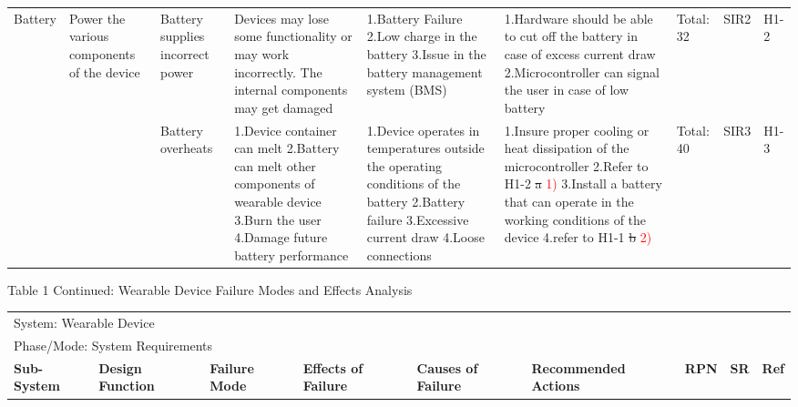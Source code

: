 \documentclass[12pt, titlepage]{article}
\begin{document}
\begin{landscape}
\begin{table}[H]
\begin{tabular}{| p{} | p{}  | p{} | p{} | p{} | p{} | p{} | p{} | p{} |}
        Battery & Power the various components of the device & Battery supplies incorrect power & Devices may lose some functionality or may work incorrectly. The internal components may get damaged & 1.Battery Failure \newline 2.Low charge in the battery \newline 3.Issue in the battery management system (BMS) & 1.Hardware should be able to cut off the battery in case of excess current draw \newline 2.Microcontroller can signal the user in case of low battery & Total: 32 & SIR2 & H1-2 \\ \cline{3-9}

        & &  Battery overheats & 1.Device container can melt \newline 2.Battery can melt other components of wearable device \newline 3.Burn the user \newline 4.Damage future battery performance & 1.Device operates in temperatures outside the operating conditions of the battery \newline 2.Battery failure \newline 3.Excessive current draw \newline 4.Loose connections  & 1.Insure proper cooling or heat dissipation of the microcontroller \newline 2.Refer to H1-2 \sout{a} \textcolor{red}{1)} \newline 3.Install a battery that can operate in the working conditions of the device \newline 4.refer to H1-1 \sout{b} \textcolor{red}{2)} & Total: 40 & SIR3 & H1-3 \\ \hline

 
        \end{tabular}

\end{table}
\begin{table}[H]
    \centering
        Table 1 Continued: Wearable Device Failure Modes and Effects Analysis

        \begin{tabular}{| p{} | p{}  | p{} | p{} | p{} | p{} | p{} | p{} | p{} |}
        \hline
        
        \multicolumn{9}{|l|}{System: Wearable Device} \\
        \multicolumn{9}{|l|}{Phase/Mode: System Requirements} \\ \hline
        \textbf{Sub-System} & \textbf{Design Function} & \textbf{Failure Mode} & \textbf{Effects of Failure} & \textbf{Causes of Failure} & \textbf{Recommended Actions} & \textbf{RPN} & \textbf{SR} & \textbf{Ref} \\ \hline
    

\end{tabular}
\end{table}
\end{landscape}
\end{document}

